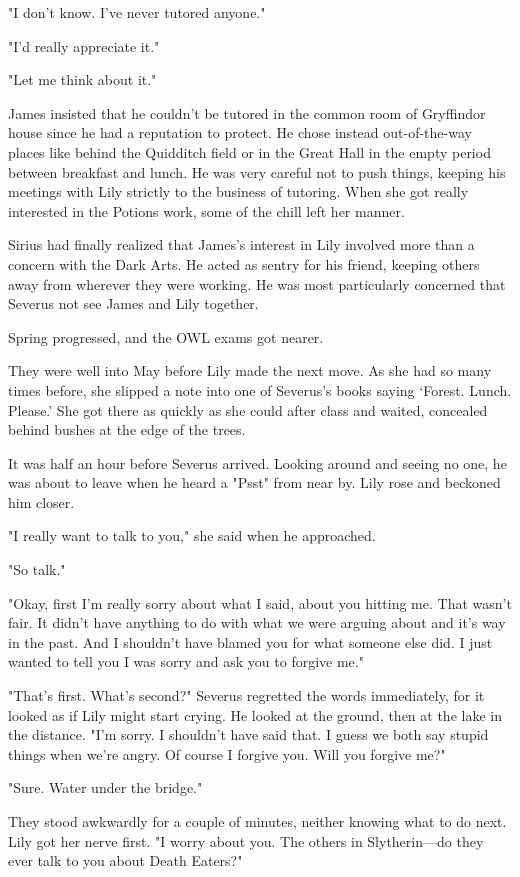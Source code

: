 "I don't know. I've never tutored anyone."

"I'd really appreciate it."

"Let me think about it."

James insisted that he couldn't be tutored in the common room of Gryffindor house since he had a reputation to protect. He chose instead out-of-the-way places like behind the Quidditch field or in the Great Hall in the empty period between breakfast and lunch. He was very careful not to push things, keeping his meetings with Lily strictly to the business of tutoring. When she got really interested in the Potions work, some of the chill left her manner.

Sirius had finally realized that James's interest in Lily involved more than a concern with the Dark Arts. He acted as sentry for his friend, keeping others away from wherever they were working. He was most particularly concerned that Severus not see James and Lily together.

Spring progressed, and the OWL exams got nearer.

They were well into May before Lily made the next move. As she had so many times before, she slipped a note into one of Severus's books saying `Forest. Lunch. Please.' She got there as quickly as she could after class and waited, concealed behind bushes at the edge of the trees.

It was half an hour before Severus arrived. Looking around and seeing no one, he was about to leave when he heard a "Psst{\el}" from near by. Lily rose and beckoned him closer.

"I really want to talk to you," she said when he approached.

"So talk."

"Okay, first I'm really sorry about what I said, about you hitting me. That wasn't fair. It didn't have anything to do with what we were arguing about and it's way in the past. And I shouldn't have blamed you for what someone else did. I just wanted to tell you I was sorry and ask you to forgive me."

"That's first. What's second?" Severus regretted the words immediately, for it looked as if Lily might start crying. He looked at the ground, then at the lake in the distance. "I'm sorry. I shouldn't have said that. I guess we both say stupid things when we're angry. Of course I forgive you. Will you forgive me?"

"Sure. Water under the bridge."

They stood awkwardly for a couple of minutes, neither knowing what to do next. Lily got her nerve first. "I worry about you. The others in Slytherin—do they ever talk to you about Death Eaters?"


